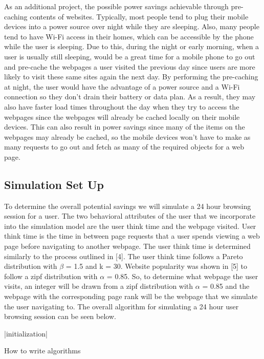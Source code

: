 As an additional project, the possible power savings achievable through pre-caching contents of websites. Typically, most people tend to plug their mobile devices into a power source over night while they are sleeping. Also, many people tend to have Wi-Fi access in their homes, which can be accessible by the phone while the user is sleeping. Due to this, during the night or early morning, when a user is usually still sleeping, would be a great time for a mobile phone to go out and pre-cache the webpages a user visited the previous day since users are more likely to visit these same sites again the next day. By performing the pre-caching at night, the user would have the advantage of a power source and a Wi-Fi connection so they don’t drain their battery or data plan. As a result, they may also have faster load times throughout the day when they try to access the webpages since the webpages will already be cached locally on their mobile devices. This can also result in power savings since many of the items on the webpages may already be cached, so the mobile devices won’t have to make as many requests to go out and fetch as many of the required objects for a web page.

\subsection*{Simulation Set Up}
To determine the overall potential savings we will simulate a 24 hour browsing session for a user. The two behavioral attributes of the user that we incorporate into the simulation model are the user think time and the webpage visited. User think time is the time in between page requests that a user spends viewing a web page before navigating to another webpage. The user think time is determined similarly to the process outlined in [4]. The user think time follows a Pareto distribution with $\beta$ = 1.5 and k = 30. Website popularity was shown in [5] to follow a zipf distribution with $\alpha$ = 0.85. So, to determine what webpage the user visits, an integer will be drawn from a zipf distribution with $\alpha$ = 0.85 and the webpage with the corresponding page rank will be the webpage that we simulate the user navigating to. The overall algorithm for simulating a 24 hour user browsing session can be seen below.

\begin{algorithm}[H]
 |initialization|
 \caption{How to write algorithms}
\end{algorithm}

